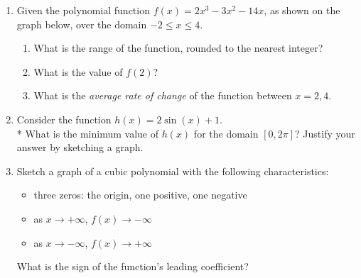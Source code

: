 \documentclass[12pt, oneside]{article}
\begin{document}
\begin{enumerate}
\item Given the polynomial function $f(x)=2x^3-3x^2-14x$, as shown on the graph below, over the domain $-2 \leq x \leq 4$.
\begin{center}
\end{center}
\begin{enumerate}
    \item What is the range of the function, rounded to the nearest integer?\\[0.8in]
    \item What is the value of $f(2)$?\\[0.8in]
    \item What is the \emph{average rate of change} of the function between $x=2,4$.
\end{enumerate}


\newpage

\item Consider the function $h(x) = 2\sin(x) + 1$.\\*
What is the minimum value of $h(x)$ for the domain $[0,2\pi]$? Justify your answer by sketching a graph. \\[2in]%


\item Sketch a graph of a cubic polynomial with the following characteristics: 
\begin{itemize}
\item three zeros: the origin, one positive, one negative
\item as $x \rightarrow + \infty$, $f(x) \rightarrow - \infty$
\item as $x \rightarrow - \infty$, $f(x) \rightarrow + \infty$
\end{itemize}
\begin{center}
\end{center} %
What is the sign of the function's leading coefficient?





\end{enumerate}
\end{document}
